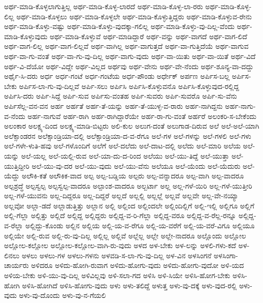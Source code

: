 ಅರ್ಥ-ಮಾಡಿ-ಕೊಳ್ಳಲಾಗುತ್ತಿಲ್ಲ
ಅರ್ಥ-ಮಾಡಿ-ಕೊಳ್ಳ-ಲಾರದೆ
ಅರ್ಥ-ಮಾಡಿ-ಕೊಳ್ಳ-ಲಾ-ರರು
ಅರ್ಥ-ಮಾಡಿ-ಕೊಳ್ಳ-ಲಿಲ್ಲ
ಅರ್ಥ-ಮಾಡಿ-ಕೊಳ್ಳಲು
ಅರ್ಥ-ಮಾಡಿ-ಕೊಳ್ಳಲೇ
ಅರ್ಥ-ಮಾಡಿ-ಕೊಳ್ಳುತ್ತಿದ್ದರು
ಅರ್ಥ-ಮಾಡಿ-ಕೊಳ್ಳುವ-ರೇನು
ಅರ್ಥ-ಮಾಡಿ-ಕೊಳ್ಳು-ವಷ್ಟು
ಅರ್ಥ-ಮಾಡಿ-ಕೊಳ್ಳು-ವುದಕ್ಕಾ-ಗಲಿಲ್ಲ
ಅರ್ಥ-ಮಾಡಿ-ಕೊಳ್ಳು-ವು-ದಿಲ್ಲ-ವೆಂದು
ಅರ್ಥ-ಮಾಡಿ-ಕೊಳ್ಳುವುದು
ಅರ್ಥ-ಮಾಡಿ-ಕೊಳ್ಳುವೆ
ಅರ್ಥ-ಮಾಡಿದ್ದಾರೆ
ಅರ್ಥ-ವನ್ನು
ಅರ್ಥ-ವಾಗದೆ
ಅರ್ಥ-ವಾಗ-ಲಿದೆ
ಅರ್ಥ-ವಾಗ-ಲಿಲ್ಲ
ಅರ್ಥ-ವಾಗ-ಲಿಲ್ಲವೆ
ಅರ್ಥ-ವಾಗಿಲ್ಲ
ಅರ್ಥ-ವಾಗುತ್ತದೆ
ಅರ್ಥ-ವಾ-ಗುತ್ತಿದೆಯೆ
ಅರ್ಥ-ವಾಗುವ
ಅರ್ಥ-ವಾ-ಗು-ವಂತೆ
ಅರ್ಥ-ವಾ-ಗು-ವು-ದಿಲ್ಲ
ಅರ್ಥ-ವಾಗು-ವುದು
ಅರ್ಥ-ವಾ-ಯಿತು
ಅರ್ಥ-ವಾ-ಯಿತೆ
ಅರ್ಥ-ವಿದೆ
ಅರ್ಥ-ವಿ-ದೆಯೋ
ಅರ್ಥ-ವಿದ್ದೇ
ಅರ್ಥ-ವಿಲ್ಲದ
ಅರ್ಥವು
ಅರ್ಥ-ವೇನು
ಅರ್ಥ-ವೇ-ನೆಂದು
ಅರ್ಥ-ಶೂನ್ಯ-ವಾ-ದದ್ದು
ಅರ್ಥೈ-ಸಿ-ದರು
ಅರ್ಧ
ಅರ್ಧ-ಗಂಟೆ
ಅರ್ಧ-ಗಂಟೆಯ
ಅರ್ಧ-ಪೌಂಡು
ಅರ್ಧೇಕ್
ಅರ್ಪಣ
ಅರ್ಪಿಸ-ಬಲ್ಲ
ಅರ್ಪಿಸ-ಬೇಕು
ಅರ್ಪಿಸ-ಲಾ-ಗು-ವು-ದಿಲ್ಲವೆ
ಅರ್ಪಿ-ಸಲು
ಅರ್ಪಿಸಿ
ಅರ್ಪಿಸಿ-ಕೊಳ್ಳುವನೊ
ಅರ್ಪಿಸಿ-ಕೊಳ್ಳುವುದ-ರಲ್ಲಿದ್ದ
ಅರ್ಪಿಸಿ-ದರು
ಅರ್ಪಿ-ಸಿದ್ದೆ
ಅರ್ಪಿ-ಸುವ
ಅರ್ಪಿಸು-ವಂತಹ
ಅರ್ಪಿ-ಸುವರು
ಅರ್ಪಿ-ಸುವರೊ
ಅರ್ಪಿ-ಸು-ವೆನು
ಅರ್ಪಿಸೆಲ್ಲ-ವನ-ವನ
ಅರ್ಹ
ಅರ್ಹತೆ
ಅರ್ಹ-ತೆ-ಯನ್ನು
ಅರ್ಹ-ತೆ-ಯುಳ್ಳ-ವ-ರಾರು
ಅರ್ಹ-ನಾಗಿದ್ದನು
ಅರ್ಹ-ನಾಗು-ವ-ನೆಂದು
ಅರ್ಹ-ನಾಗುವೆ
ಅರ್ಹ-ರಾಗಿ
ಅರ್ಹ-ರಾಗಿದ್ದಾರೆಯೇ
ಅರ್ಹ-ರಾ-ಗು-ವಂತೆ
ಅರ್ಹರೆ
ಅಲಂಕರಿ-ಸ-ಬೇಕೆಂದು
ಅಲಂಕಾರ
ಅಲಕ್ಷ್ಯ-ದಿಂದ
ಅಲಕ್ಷ್ಯ-ಮಾಡಿ-ಬಿಟ್ಟರು
ಅಲಿ-ಕುಲ
ಅಲುಗ-ದಂತೆ
ಅಲುಗಾಡ-ದಿರುವ
ಅಲೆ
ಅಲೆ-ಅಲೆ-ಯಾಗಿ
ಅಲೆಕ್ಸಾಂಡರನ
ಅಲೆಕ್ಸಾಂಡ್ರಿಯಾ-ದಲ್ಲಿ
ಅಲೆಕ್ಸಾಂಡ್ರಿಯಾ-ದ-ವ-ರೆಗೂ
ಅಲೆ-ಗಳ
ಅಲೆ-ಗಳನ್ನು
ಅಲೆ-ಗಳಲಿ
ಅಲೆ-ಗಳು
ಅಲೆ-ಗಳೇ-ಳುತಿ-ಹವು
ಅಲೆ-ಗಳೊಂದಿಗೆ
ಅಲೆಗೆ
ಅಲೆ-ದಲೆದು
ಅಲೆ-ದಾಟ-ದಲ್ಲಿ
ಅಲೆದು
ಅಲೆ-ಮಾರಿ
ಅಲೆಯ
ಅಲೆ-ಯನ್ನು
ಅಲೆ-ಯಲ್ಲ
ಅಲೆ-ಯಲ್ಲಿ-ರುವ
ಅಲೆ-ಯಾ-ದು-ದ-ರಿಂದ
ಅಲೆಯು
ಅಲೆ-ಯು-ತಿದ್ದೆ
ಅಲೆ-ಯುತ್ತಾ
ಅಲೆ-ಯುತ್ತಿದ್ದೀರಿ
ಅಲೆ-ಯು-ವು-ದರ
ಅಲೆ-ಯು-ವುದು
ಅಲೆ-ಯು-ವೆನು
ಅಲೆಯೂ
ಅಲೆ-ಯೆಂದು
ಅಲೆ-ಯೆದುರು
ಅಲೆ-ಯೆದ್ದು
ಅಲೌಕಿ-ಕತೆ
ಅಲೌಕಿಕ-ವಾದ
ಅಲ್ಪ
ಅಲ್ಪ-ಬಡ್ಡಿಯ
ಅಲ್ಪರು
ಅಲ್ಪ-ವನ್ನಾದರೂ
ಅಲ್ಪ-ವಾಗಿ
ಅಲ್ಪ-ವಾದರೂ
ಅಲ್ಪಶ್ರದ್ಧೆ
ಅಲ್ಪಸ್ವಲ್ಪ
ಅಲ್ಪಸ್ವಲ್ಪ-ವಾದರೂ
ಅಲ್ಪಾಂಶ-ವಾದರೂ
ಅಲ್ಬರ್ಟಾ
ಅಲ್ಲ
ಅಲ್ಲ-ಗಳೆ-ಯಿರಿ
ಅಲ್ಲ-ಗಳೆ-ಯುತ್ತೀರಿ
ಅಲ್ಲ-ಗಳೆ-ಯುವನು
ಅಲ್ಲ-ದಿದ್ದರೂ
ಅಲ್ಲ-ದಿದ್ದರೆ
ಅಲ್ಲದೆ
ಅಲ್ಲಲ್ಲಿ
ಅಲ್ಲಲ್ಲೆ
ಅಲ್ಲವೆ
ಅಲ್ಲವೇ
ಅಲ್ಲ-ವೇ-ನಯ್ಯಾ
ಅಲ್ಲವೋ
ಅಲ್ಲಾ-ಡದೆ
ಅಲ್ಲಾಡುತ್ತಿತ್ತು
ಅಲ್ಲಾನ
ಅಲ್ಲಿ
ಅಲ್ಲಿಂದ
ಅಲ್ಲಿಂದಲೇ
ಅಲ್ಲಿಂದಿಲ್ಲಿಗೆ
ಅಲ್ಲಿ-ಇಲ್ಲಿ
ಅಲ್ಲಿಗೂ
ಅಲ್ಲಿಗೆ
ಅಲ್ಲಿ-ಗೆಲ್ಲಾ
ಅಲ್ಲಿತ್ತು
ಅಲ್ಲಿದೆ
ಅಲ್ಲಿದ್ದ
ಅಲ್ಲಿದ್ದರು
ಅಲ್ಲಿದ್ದ-ವ-ರಿ-ಗೆಲ್ಲಾ
ಅಲ್ಲಿದ್ದ-ವರೂ
ಅಲ್ಲಿದ್ದ-ವ-ರೆಲ್ಲ-ರನ್ನೂ
ಅಲ್ಲಿದ್ದ-ವ-ರೆಲ್ಲಾ
ಅಲ್ಲಿದ್ದು-ಕೊಂಡು
ಅಲ್ಲಿನ
ಅಲ್ಲಿಯ
ಅಲ್ಲಿ-ಯ-ವ-ರೆಗೂ
ಅಲ್ಲಿ-ಯ-ವರೆಗೆ
ಅಲ್ಲಿ-ಯ-ವರೆ-ವಿಗೂ
ಅಲ್ಲಿಯೂ
ಅಲ್ಲಿಯೇ
ಅಲ್ಲಿ-ರುವ
ಅಲ್ಲಿ-ರು-ವು-ದಿಲ್ಲ
ಅಲ್ಲಿಲ್ಲ
ಅಲ್ಲಿವೆ
ಅಲ್ಲೆಲ್ಲ
ಅಲ್ಲೇ
ಅಲ್ಲೇ-ನಾದರೂ
ಅಲ್ಲೊಂದು
ಅಲ್ಲೋಲ
ಅಲ್ಲೋಲ-ಕಲ್ಲೋಲ
ಅಲ್ಲೋಲ-ಕಲ್ಲೋಲ-ವಾಗಿ-ರು-ವುದು
ಅಳದ
ಅಳ-ಬೇಕು
ಅಳ-ಲನ್ನು
ಅಳಲಿ-ಗಳು-ಕದೆ
ಅಳ-ಲಿನಲು
ಅಳಲು
ಅಳಲು-ಗಳ
ಅಳಲು-ಗಳನು
ಅಳವಡಿ-ಸ-ಲಾ-ಗು-ವು-ದಿಲ್ಲ
ಅಳ-ವಿನ
ಅಳಸಿಂಗನೆ
ಅಳಸಿಂಗಾ-ಚಾರ್ಯರು
ಅಳಿದರೂ
ಅಳಿದು-ಹೋಗಿ-ರುವಾಗ
ಅಳಿದು-ಹೋಗು-ವುದು
ಅಳಿದು-ಹೋಗು-ವುದೋ
ಅಳಿ-ಯದ
ಅಳಿಯ-ಬೇಕು
ಅಳಿ-ಯು-ವು-ದಿಲ್ಲ
ಅಳಿವಿಲ್ಲವು
ಅಳಿ-ಸಲಾ-ಗದ
ಅಳಿಸಿ
ಅಳಿ-ಸಿಯೇ
ಅಳಿಸಿ-ಹೋಗ-ಬೇಕು
ಅಳಿಸಿ-ಹೋಗಿ
ಅಳಿಸಿ-ಹೋಗಿದೆ
ಅಳಿಸಿ-ಹೋಗು-ವುದು
ಅಳು
ಅಳು-ತಲಿದ್ದೆ
ಅಳುತ್ತ
ಅಳು-ವು-ದಕ್ಕೆ
ಅಳು-ವುದ-ರಲ್ಲಿ
ಅಳು-ವುದು
ಅಳು-ವು-ದೊಂದು
ಅಳು-ವು-ನ-ಗೆಯಲಿ
